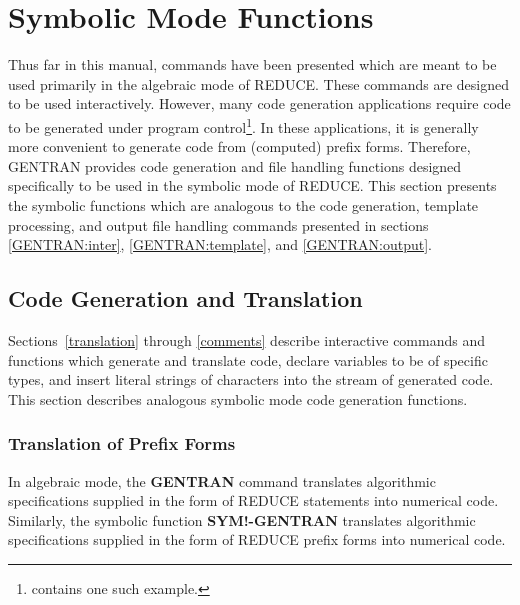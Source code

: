 \section{Symbolic Mode Functions}

Thus far in this manual, commands have been presented which are meant
to be used primarily in the algebraic mode of REDUCE.  These commands
are designed to be used interactively.  However, many code generation
applications require code to be generated under program control\footnote{
\cite{vandenHeuvel:86ms} contains one such example.}. In these
applications, it is generally more convenient to generate code from
(computed) prefix forms.  Therefore, GENTRAN provides code generation
and file handling functions designed specifically to be used in the
symbolic mode of REDUCE.  This section presents the symbolic functions
which are analogous to the code generation, template processing, and
output file handling commands presented in sections \ref{GENTRAN:inter},
 \ref{GENTRAN:template}, and \ref{GENTRAN:output}.

\subsection{Code Generation and Translation}
Sections~\ref{translation} through \ref{comments}
describe interactive commands and functions which
generate and translate code, declare variables to be of
specific types, and insert literal strings of characters into the
stream of generated code.  This section describes analogous symbolic
mode code generation functions.

\subsubsection{Translation of Prefix Forms}
In algebraic mode, the {\bf GENTRAN} command translates algorithmic
specifications supplied in the form of REDUCE statements into
numerical code.  Similarly, the symbolic function {\bf SYM!-GENTRAN}
translates algorithmic specifications supplied in the form of REDUCE
prefix forms into numerical code.

